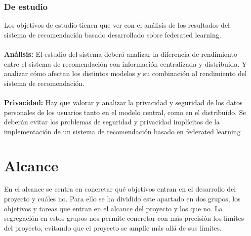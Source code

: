\subsubsection{De estudio}
Los objetivos de estudio tienen que ver con el análisis de los resultados del sistema de recomendación basado desarrollado sobre federated learning.
\\ \\
\textbf{Análisis: }
El estudio del sistema deberá analizar la diferencia de rendimiento entre el sistema de recomendación con información centralizada y distribuida. Y analizar cómo afectan los distintos modelos y su combinación al rendimiento del sistema de recomendación.
\\ \\
\textbf{Privacidad: }
Hay que valorar y analizar la privacidad y seguridad de los datos personales de los usuarios tanto en el modelo central, como en el distribuido. Se deberán evitar los problemas de seguridad y privacidad implícitos de la implementación de un sistema de recomendación basado en federated learning

\section{Alcance}
En el alcance se centra en concretar qué objetivos entran en el desarrollo del proyecto y cuáles no. Para ello se ha dividido este apartado en dos grupos, los objetivos y tareas que entran en el alcance del proyecto y los que no. La segregación en estos grupos nos permite concretar con más precisión los límites del proyecto, evitando que el proyecto se amplíe más allá de sus límites. 

